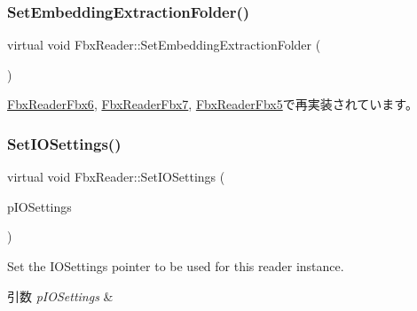 \mbox{\label{class_fbx_reader_a640eef510ddb298b2eaad0545b79de66}} 
\subsubsection{\texorpdfstring{Set\+Embedding\+Extraction\+Folder()}{SetEmbeddingExtractionFolder()}}
{\footnotesize\ttfamily virtual void Fbx\+Reader\+::\+Set\+Embedding\+Extraction\+Folder (\begin{DoxyParamCaption}\item[{const char $\ast$}]{ }\end{DoxyParamCaption})\hspace{0.3cm}{\ttfamily [virtual]}}



\hyperlink{class_fbx_reader_fbx6_a574e93fb5fc9fd89050b11c383316ab2}{Fbx\+Reader\+Fbx6}, \hyperlink{class_fbx_reader_fbx7_a411118263811ffa136e233abfb5a0d02}{Fbx\+Reader\+Fbx7}, \hyperlink{class_fbx_reader_fbx5_ab910914828f297f51c28d88f466d6928}{Fbx\+Reader\+Fbx5}で再実装されています。

\mbox{\label{class_fbx_reader_af39e468081c3ebe63565409ef36f833a}} 
\subsubsection{\texorpdfstring{Set\+I\+O\+Settings()}{SetIOSettings()}}
{\footnotesize\ttfamily virtual void Fbx\+Reader\+::\+Set\+I\+O\+Settings (\begin{DoxyParamCaption}\item[{\hyperlink{class_fbx_i_o_settings}{Fbx\+I\+O\+Settings} $\ast$}]{p\+I\+O\+Settings }\end{DoxyParamCaption})\hspace{0.3cm}{\ttfamily [virtual]}}

Set the I\+O\+Settings pointer to be used for this reader instance. 
\begin{DoxyParams}{引数}
{\em p\+I\+O\+Settings} & \\
\hline
\end{DoxyParams}
\mbox{\label{class_fbx_reader_aeba190e276718b1abfa6c26a83d2c363}} 
